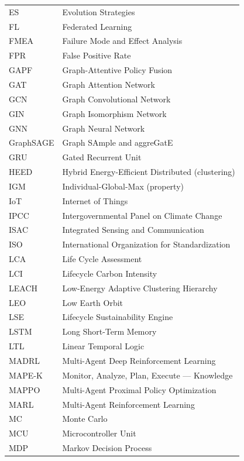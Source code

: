 \begin{longtable}{lp{5in}}
ES         & Evolution Strategies\\
FL         & Federated Learning\\
FMEA       & Failure Mode and Effect Analysis\\
FPR        & False Positive Rate\\
GAPF       & Graph-Attentive Policy Fusion\\
GAT        & Graph Attention Network\\
GCN        & Graph Convolutional Network\\
GIN        & Graph Isomorphism Network\\
GNN        & Graph Neural Network\\
GraphSAGE  & Graph SAmple and aggreGatE\\
GRU        & Gated Recurrent Unit\\
HEED       & Hybrid Energy-Efficient Distributed (clustering)\\
IGM        & Individual-Global-Max (property)\\
IoT        & Internet of Things\\
IPCC       & Intergovernmental Panel on Climate Change\\
ISAC       & Integrated Sensing and Communication\\
ISO        & International Organization for Standardization\\
LCA        & Life Cycle Assessment\\
LCI        & Lifecycle Carbon Intensity\\
LEACH      & Low-Energy Adaptive Clustering Hierarchy\\
LEO        & Low Earth Orbit\\
LSE        & Lifecycle Sustainability Engine\\
LSTM       & Long Short-Term Memory\\
LTL        & Linear Temporal Logic\\
MADRL      & Multi-Agent Deep Reinforcement Learning\\
MAPE-K     & Monitor, Analyze, Plan, Execute --- Knowledge\\
MAPPO      & Multi-Agent Proximal Policy Optimization\\
MARL       & Multi-Agent Reinforcement Learning\\
MC         & Monte Carlo\\
MCU        & Microcontroller Unit\\
MDP        & Markov Decision Process\\

\end{longtable}
